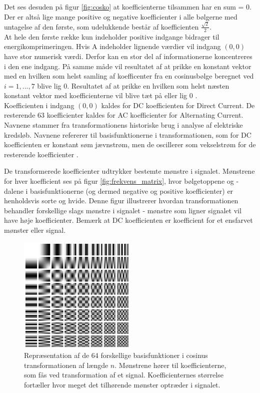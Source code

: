 Det ses desuden på figur \vref{fig:cosko} at koefficienterne tilsammen har en sum = 0. Der er altså lige mange positive og negative koefficienter i alle bølgerne med untagelse af den første, som udelukkende består af koefficienten $\frac{\sqrt{2}}{2}$.\\
At hele den første række kun indeholder positive indgange bidrager til energikomprimeringen. Hvis A indeholder lignende værdier vil indgang $(0,0)$ have stor numerisk værdi. Derfor kan en stor del af informationerne koncentreres i den ene indgang. På samme måde vil resultatet af at prikke en konstant vektor med en hvilken som helst samling af koefficenter fra en cosinusbølge beregnet ved $i=1,...,7$ blive lig 0. Resultatet af at prikke en hvilken som helst næsten konstant vektor med koefficienterne vil blive tæt på eller lig 0 \citep{whydomath_dct}.\\
Koefficienten i indgang $(0,0)$ kaldes for DC koefficienten for Direct Current. De resterende 63 koefficienter kaldes for AC koefficienter for Alternating Current. Navnene stammer fra transformationens historiske brug i analyse af elektriske kredsløb. Navnene refererer til basisfunktionerne i transformationen, som for DC koefficienten er konstant søm jævnstrøm, men de oscillerer som vekselstrøm for de resterende koefficienter  \citep{lokminglui_DCT}.

De transformerede koefficienter udtrykker bestemte mønstre i signalet. Mønstrene for hver koefficient ses på figur \vref{fig:frekvens_matrix}, hvor bølgetoppene og -dalene i basisfunktionerne (og dermed negative og positive koefficienter) er henholdsvis sorte og hvide. Denne figur illustrerer hvordan transformationen behandler forskellige slags mønstre i signalet - mønstre som ligner signalet vil have høje koefficienter. Bemærk at DC koefficienten er koefficient for et ensfarvet mønster eller signal.
\begin{figure}[htbp]
\centering
\includegraphics[width=0.5\textwidth]{billeder/frekvensmatrix.png}
\caption{Repræsentation af de 64 forskellige basisfunktioner i cosinus transformationen af længde $n$. Mønstrene hører til koefficienterne, som fås ved transformation af et signal. Koefficienternes størrelse fortæller hvor meget det tilhørende mønster optræder i signalet.}
\label{fig:frekvens_matrix}
\end{figure}

